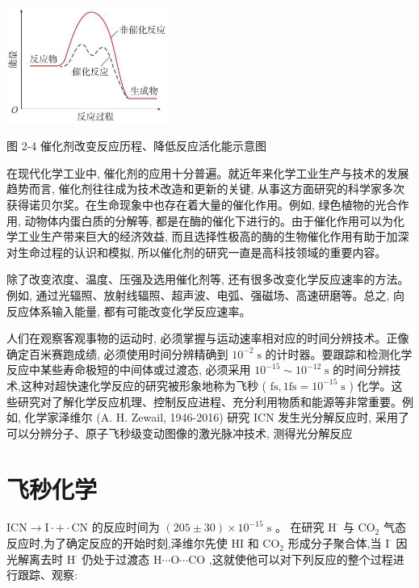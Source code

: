 \documentclass[10pt]{article}
\begin{document}
\begin{center}
\includegraphics[max width=0.4\textwidth]{images/0190da9d-8bfd-732f-bc2c-0b21d0f13b91_34_311708.jpg}
\end{center}

图 2-4 催化剂改变反应历程、降低反应活化能示意图

在现代化学工业中, 催化剂的应用十分普遍。就近年来化学工业生产与技术的发展趋势而言, 催化剂往往成为技术改造和更新的关键, 从事这方面研究的科学家多次获得诺贝尔奖。在生命现象中也存在着大量的催化作用。例如, 绿色植物的光合作用, 动物体内蛋白质的分解等, 都是在酶的催化下进行的。由于催化作用可以为化学工业生产带来巨大的经济效益, 而且选择性极高的酶的生物催化作用有助于加深对生命过程的认识和模拟, 所以催化剂的研究一直是高科技领域的重要内容。

除了改变浓度、温度、压强及选用催化剂等, 还有很多改变化学反应速率的方法。例如, 通过光辐照、放射线辐照、超声波、电弧、强磁场、高速研磨等。总之, 向反应体系输入能量, 都有可能改变化学反应速率。

人们在观察客观事物的运动时, 必须掌握与运动速率相对应的时间分辨技术。正像确定百米赛跑成绩, 必须使用时间分辨精确到 \({10}^{-2}\mathrm{\;s}\) 的计时器。要跟踪和检测化学反应中某些寿命极短的中间体或过渡态, 必须采用 \({10}^{-{15}} \sim {10}^{-{12}}\mathrm{\;s}\) 的时间分辨技术,这种对超快速化学反应的研究被形象地称为飞秒 ( \(\mathrm{{fs}},1\mathrm{{fs}} = {10}^{-{15}}\mathrm{\;s}\) ) 化学。这些研究对了解化学反应机理、控制反应进程、充分利用物质和能源等非常重要。例如, 化学家泽维尔 (A. H. Zewail, 1946-2016) 研究 ICN 发生光分解反应时, 采用了可以分辨分子、原子飞秒级变动图像的激光脉冲技术, 测得光分解反应

\section*{飞秒化学}

\(\mathrm{{ICN}} \rightarrow \mathrm{I} \cdot + \cdot \mathrm{{CN}}\) 的反应时间为 \(\left( {{205} \pm {30}}\right) \times {10}^{-{15}}\mathrm{\;s}\) 。 在研究 \({\mathrm{H}}^{ \cdot }\) 与 \({\mathrm{{CO}}}_{2}\) 气态反应时,为了确定反应的开始时刻,泽维尔先使 \(\mathrm{{HI}}\) 和 \({\mathrm{{CO}}}_{2}\) 形成分子聚合体,当 \({\mathrm{I}}^{ \cdot }\) 因光解离去时 \({\mathrm{H}}^{ \cdot }\) 仍处于过渡态 \(\mathrm{H}\cdots \mathrm{O}\cdots \mathrm{{CO}}\) ,这就使他可以对下列反应的整个过程进行跟踪、观察:
\end{document}
